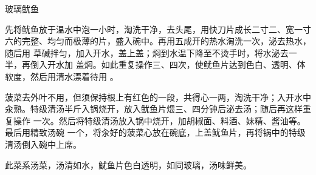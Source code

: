 \begin{recipe}{玻璃鱿鱼}

\ingredients


\preparation

\step 先将鱿鱼放于温水中泡一小时，淘洗干净，去头尾，用快刀片成长二寸二、宽一寸
六的完整、均匀而极薄的片，盛入碗中。再用五成开的热水淘洗一次，泌去热水，随后用
草碱拌匀，加入开水，盖上盖；焖到水温下降至不烫手时，将水泌去一半，再倒入开水加
盖焖。如此重复操作三、四次，使鱿鱼片达到色白、透明、体软度，然后用清水漂着待用
。

\step 菠菜去外叶不用，但须保持根上有红色的一段，共得心一两，淘洗干净；入开水中
汆熟。特级清汤半斤入锅烧开，放入鱿鱼片煨三、四分钟后泌去汤；随后再这样重复操作
一次。然后将特级清汤放入锅中烧开，加胡椒面、料酒、妹精、酱油等。最后用精致汤碗
一个，将汆好的菠菜心放在碗底，上盖鱿鱼片，再将锅中的特级清汤倒入碗中上席。

\features

此菜系汤菜，汤清如水，鱿鱼片色白透明，如同玻璃，汤味鲜美。

\end{recipe}

